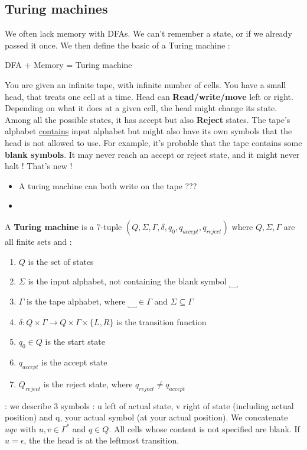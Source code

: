 \documentclass[12pt,a4paper]{article}
\newcommand{\<}{\langle}
\renewcommand{\>}{\rangle}
\begin{document}
\subsection{Turing machines}
We often lack memory with DFAs. We can't remember a state, or if we already passed it once. We then define the basic of a Turing machine : 
\begin{center}
    DFA + Memory = Turing machine
\end{center}
You are given an infinite tape, with infinite number of cells. You have a small head, that treats one cell at a time. Head can \textbf{Read/write/move} left or right. Depending on what it does at a given cell, the head might change its state. Among all the possible states, it has accept but also \textbf{Reject} states. The tape's alphabet \uline{contains} input alphabet but might also have its own symbols that the head is not allowed to use. For example, it's probable that the tape contains some \textbf{blank symbols}. It may never reach an accept or reject state, and it might never halt ! That's new !\\
\begin{itemize}
    \item     A turing machine can both write on the tape ???
    \item     {}
\end{itemize}
A \textbf{Turing machine} is a 7-tuple $(Q, \Sigma, \Gamma, \delta, q_0, q_{accept},q_{reject})$ where $Q,\Sigma, \Gamma$ are all finite sets and :
\begin{enumerate}
    \item $Q$ is the set of states
    \item $\Sigma$ is the input alphabet, not containing the blank symbol $\underbracket{\quad}$
    \item $\Gamma$ is the tape alphabet, where $\underbracket{\quad} \in \Gamma$ and $\Sigma \subseteq \Gamma$
    \item $\delta : Q \times \Gamma \to Q \times \Gamma \times \{L,R\}$ is the transition function
    \item $q_0 \in Q$ is the start state
    \item     $q_{accept}$ is the accept state
    \item     $Q_{reject}$ is the reject state, where $q_{reject} \neq q_{accept}$ 
\end{enumerate}
 : we describe 3 symbols : u left of actual state, v right of state (including actual position) and q, your actual symbol (at your actual position). We concatenate $uqv$ with $u,v \in \Gamma^*$ and $q \in Q$. All cells whose content is not specified are blank. If $u = \epsilon$, the the head is at the leftmost transition.
\end{document}
